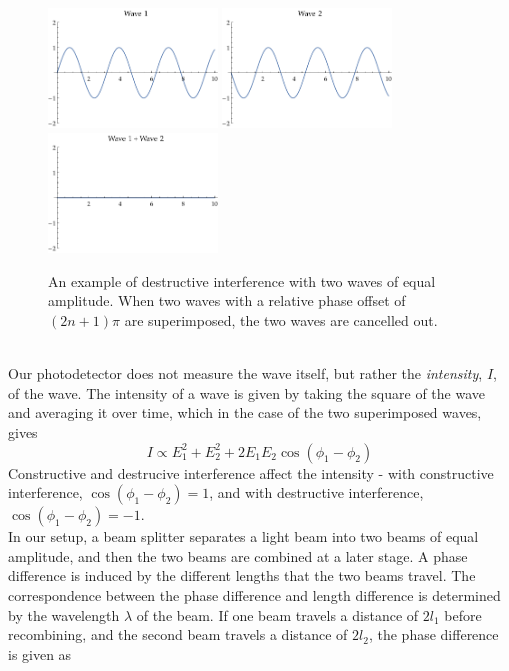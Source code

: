   \begin{figure}
    \includegraphics[width=0.4\textwidth]{sin1.pdf}
    \includegraphics[width=0.4\textwidth]{shifted.pdf}
    \includegraphics[width=0.4\textwidth]{destructive.pdf}
    \caption{An example of destructive interference with two waves of equal amplitude. When two waves with a relative phase offset of $(2n+1)\pi$ are superimposed, the two waves are cancelled out.}
    \label{fig:super}
  \end{figure}
  \\
  Our photodetector does not measure the wave itself, but rather the \textit{intensity}, $I$, of the wave. The intensity of a wave is given by taking the square of the wave and averaging it over time, which in the case of the two superimposed waves, gives
  \begin{equation}
    I \propto E_1^2 + E_2^2 + 2E_1 E_2 \cos(\phi_1 - \phi_2)
  \end{equation}
  Constructive and destrucive interference affect the intensity - with constructive interference, $\cos(\phi_1 - \phi_2) = 1$, and with destructive interference, $\cos(\phi_1 - \phi_2) = -1$.
  \\
  In our setup, a beam splitter separates a light beam into two beams of equal amplitude, and then the two beams are combined at a later stage. A phase difference is induced by the different lengths that the two beams travel. The correspondence between the phase difference and length difference is determined by the wavelength $\lambda$ of the beam. If one beam travels a distance of $2l_1$ before recombining, and the second beam travels a distance of $2l_2$, the phase difference is given as
